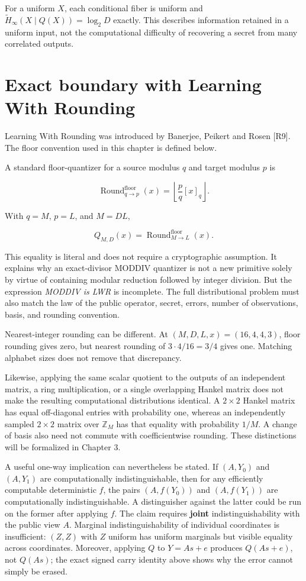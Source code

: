 \documentclass[
  11pt,
  a4paper,
  oneside]{report}
\begin{document}
For a uniform \(X\), each conditional fiber is uniform and
\(\widetilde H_\infty(X\mid Q(X))=\log_2D\) exactly. This describes
information retained in a uniform input, not the computational
difficulty of recovering a secret from many correlated outputs.

\section{Exact boundary with Learning With
Rounding}\label{exact-boundary-with-learning-with-rounding}

Learning With Rounding was introduced by Banerjee, Peikert and Rosen
{[}R9{]}. The floor convention used in this chapter is defined below.

A standard floor-quantizer for a source modulus \(q\) and target modulus
\(p\) is

\[
\operatorname{Round}^{\mathrm{floor}}_{q\rightarrow p}(x)
=\left\lfloor\frac{p}{q}[x]_q\right\rfloor.
\]

With \(q=M\), \(p=L\), and \(M=DL\),

\[
Q_{M,D}(x)=\operatorname{Round}^{\mathrm{floor}}_{M\rightarrow L}(x).
\]

This equality is literal and does not require a cryptographic
assumption. It explains why an exact-divisor MODDIV quantizer is not a
new primitive solely by virtue of containing modular reduction followed
by integer division. But the expression \emph{MODDIV is LWR} is
incomplete. The full distributional problem must also match the law of
the public operator, secret, errors, number of observations, basis, and
rounding convention.

Nearest-integer rounding can be different. At \((M,D,L,x)=(16,4,4,3)\),
floor rounding gives zero, but nearest rounding of \(3\cdot4/16=3/4\)
gives one. Matching alphabet sizes does not remove that discrepancy.

Likewise, applying the same scalar quotient to the outputs of an
independent matrix, a ring multiplication, or a single overlapping
Hankel matrix does not make the resulting computational distributions
identical. A \(2\times2\) Hankel matrix has equal off-diagonal entries
with probability one, whereas an independently sampled \(2\times2\)
matrix over \(\mathbb Z_M\) has that equality with probability \(1/M\).
A change of basis also need not commute with coefficientwise rounding.
These distinctions will be formalized in Chapter 3.

A useful one-way implication can nevertheless be stated. If \((A,Y_0)\)
and \((A,Y_1)\) are computationally indistinguishable, then for any
efficiently computable deterministic \(f\), the pairs \((A,f(Y_0))\) and
\((A,f(Y_1))\) are computationally indistinguishable. A distinguisher
against the latter could be run on the former after applying \(f\). The
claim requires \textbf{joint} indistinguishability with the public view
\(A\). Marginal indistinguishability of individual coordinates is
insufficient: \((Z,Z)\) with \(Z\) uniform has uniform marginals but
visible equality across coordinates. Moreover, applying \(Q\) to
\(Y=As+e\) produces \(Q(As+e)\), not \(Q(As)\); the exact signed carry
identity above shows why the error cannot simply be erased.
\end{document}
